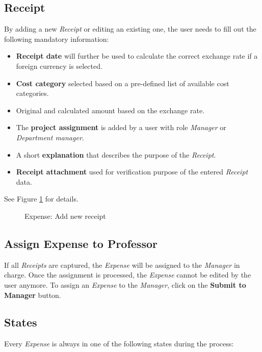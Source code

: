 \subsection{Receipt}
\label{sec:addreceipt}
By adding a new \textit{Receipt} or editing an existing one, the user needs to fill out the following mandatory information:
\begin{itemize}
    \item \textbf{Receipt date} will further be used to calculate the correct exchange rate if a foreign currency is selected.
    \item \textbf{Cost category} selected based on a pre-defined list of available cost categories.
    \item Original and calculated amount based on the exchange rate.
    \item The \textbf{project assignment} is added by a user with role \textit{Manager} or \textit{Department manager}.
    \item A short \textbf{explanation} that describes the purpose of the \textit{Receipt}.
    \item \textbf{Receipt attachment} used for verification purpose of the entered \textit{Receipt} data.
\end{itemize}

See Figure \ref{fig:expenses-add01} for details.


\begin{figure}[H]
    \centering
    \caption{Expense: Add new receipt}
    \label{fig:expenses-add01}
\end{figure}

\subsection{Assign Expense to Professor}
If all \textit{Receipts} are captured, the \textit{Expense} will be assigned to the \textit{Manager} in charge. Once the assignment is processed, the \textit{Expense} cannot be edited by the user anymore. To assign an \textit{Expense} to the \textit{Manager}, click on the \textbf{Submit to Manager} button.

\subsection{States}
\label{sec:states}
Every \textit{Expense} is always in one of the following states during the process:

